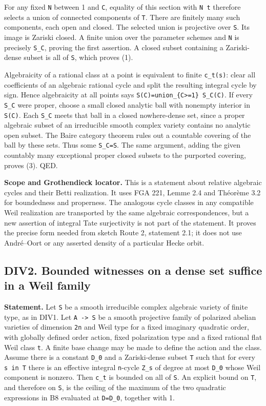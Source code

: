 \documentclass[11pt,a4paper]{article}
\theoremstyle{definition}
\begin{document}
For any fixed \texttt{N} between 1 and \texttt{C}, equality of this
section with \texttt{N\ t} therefore selects a union of connected
components of \texttt{T}. There are finitely many such components, each
open and closed. The selected union is projective over \texttt{S}. Its
image is Zariski closed. A finite union over the parameter schemes and
\texttt{N} is precisely \texttt{S\_C}, proving the first assertion. A
closed subset containing a Zariski-dense subset is all of \texttt{S},
which proves (1).

Algebraicity of a rational class at a point is equivalent to finite
\texttt{c\_t(s)}: clear all coefficients of an algebraic rational cycle
and split the resulting integral cycle by sign. Hence algebraicity at
all points says \texttt{S(C)=union\_\{C\textgreater{}=1\}\ S\_C(C)}. If
every \texttt{S\_C} were proper, choose a small closed analytic ball
with nonempty interior in \texttt{S(C)}. Each \texttt{S\_C} meets that
ball in a closed nowhere-dense set, since a proper algebraic subset of
an irreducible smooth complex variety contains no analytic open subset.
The Baire category theorem rules out a countable covering of the ball by
these sets. Thus some \texttt{S\_C=S}. The same argument, adding the
given countably many exceptional proper closed subsets to the purported
covering, proves (3). QED.

\textbf{Scope and Grothendieck locator.} This is a statement about
relative algebraic cycles and their Betti realization. It uses FGA 221,
Lemme 2.4 and Théorème 3.2 for boundedness and properness. The analogous
cycle classes in any compatible Weil realization are transported by the
same algebraic correspondences, but a new assertion of integral Tate
surjectivity is not part of the statement. It proves the precise form
needed from sketch Route 2, statement 2.1; it does not use André--Oort
or any asserted density of a particular Hecke orbit.

\subsection{DIV2. Bounded witnesses on a dense set suffice in a Weil
family}\label{bounded-division-div2.-bounded-witnesses-on-a-dense-set-suffice-in-a-weil-family}

\textbf{Statement.} Let \texttt{S} be a smooth irreducible complex
algebraic variety of finite type, as in DIV1. Let
\texttt{A\ -\textgreater{}\ S} be a smooth projective family of
polarized abelian varieties of dimension \texttt{2n} and Weil type for a
fixed imaginary quadratic order, with globally defined order action,
fixed polarization type and a fixed rational flat Weil class \texttt{t}.
A finite base change may be made to define the action and the class.
Assume there is a constant \texttt{D\_0} and a Zariski-dense subset
\texttt{T} such that for every \texttt{s\ in\ T} there is an effective
integral \texttt{n}-cycle \texttt{Z\_s} of degree at most \texttt{D\_0}
whose Weil component is nonzero. Then \texttt{c\_t} is bounded on all of
\texttt{S}. An explicit bound on \texttt{T}, and therefore on
\texttt{S}, is the ceiling of the maximum of the two quadratic
expressions in B8 evaluated at \texttt{D=D\_0}, together with 1.
\end{document}
